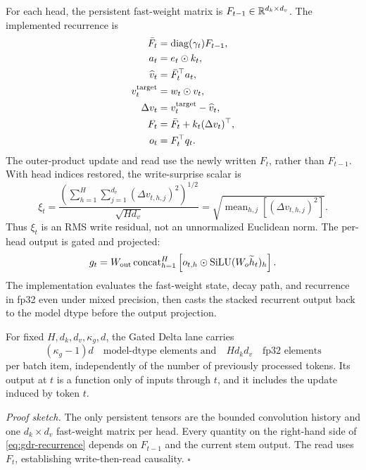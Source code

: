 For each head, the persistent fast-weight matrix is
\(F_{t-1}\in\mathbb{R}^{d_k\times d_v}\).  The implemented recurrence is
\begin{align}
  \bar F_t
    &=\operatorname{diag}(\gamma_t)F_{t-1}, \\
  a_t&=e_t\odot k_t, \\
  \widehat v_t
    &=\bar F_t^\top a_t, \\
  v_t^{\mathrm{target}}
    &=w_t\odot v_t, \\
  \Delta v_t
    &=v_t^{\mathrm{target}}-\widehat v_t, \\
  F_t
    &=\bar F_t+k_t(\Delta v_t)^\top, \\
  o_t&=F_t^\top q_t.
  \label{eq:gdr-recurrence}
\end{align}
The outer-product update and read use the newly written \(F_t\), rather than
\(F_{t-1}\).  With head indices restored, the write-surprise scalar is
\begin{equation}
  \xi_t
  =
  \frac{
    \left(
      \sum_{h=1}^{H}\sum_{j=1}^{d_v}
      (\Delta v_{t,h,j})^2
    \right)^{1/2}
  }{\sqrt{Hd_v}}
  =
  \sqrt{
    \operatorname{mean}_{h,j}
    [(\Delta v_{t,h,j})^2]
  }.
  \label{eq:write-surprise}
\end{equation}
Thus \(\xi_t\) is an RMS write residual, not an unnormalized Euclidean norm.
The per-head output is gated and projected:
\begin{equation}
  g_t
  =
  W_{\mathrm{out}}
  \operatorname{concat}_{h=1}^{H}
  \left[
    o_{t,h}\odot
    \operatorname{SiLU}(W_o\widetilde h_t)_h
  \right].
  \label{eq:gdr-output}
\end{equation}
The implementation evaluates the fast-weight state, decay path, and recurrence
in fp32 even under mixed precision, then casts the stacked recurrent output
back to the model dtype before the output projection.

\begin{proposition}
\label{prop:gdr-state-causality}
For fixed \(H,d_k,d_v,\kappa_g,d\), the Gated Delta lane carries
\begin{equation}
  (\kappa_g-1)d
  \quad\text{model-dtype elements and}\quad
  Hd_kd_v
  \quad\text{fp32 elements}
  \label{eq:gdr-state-elements}
\end{equation}
per batch item, independently of the number of previously processed tokens.
Its output at \(t\) is a function only of inputs through \(t\), and it includes
the update induced by token \(t\).
\end{proposition}
\noindent\emph{Proof sketch.}
The only persistent tensors are the bounded convolution history and one
\(d_k\times d_v\) fast-weight matrix per head.  Every quantity on the
right-hand side of \eqref{eq:gdr-recurrence} depends on \(F_{t-1}\) and the
current stem output.  The read uses \(F_t\), establishing write-then-read
causality. \hfill\(\square\)

